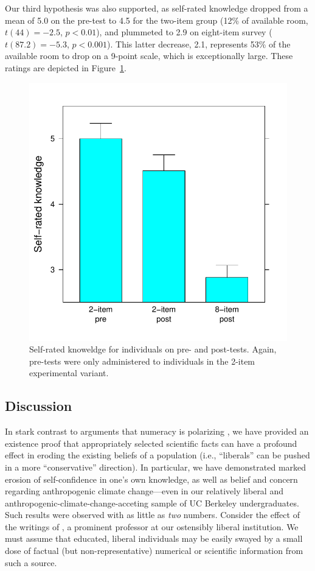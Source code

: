 Our third hypothesis was also supported, as self-rated knowledge dropped from a
mean of 5.0 on the pre-test to 4.5 for the two-item group (12\% of available
room, $t(44)=-2.5$, $p<0.01$), and plummeted to 2.9 on eight-item survey
($t(87.2)=-5.3$, $p<0.001$). This latter decrease, 2.1, represents 53\% of the
available room to drop on a 9-point scale, which is exceptionally large. These
ratings are depicted in Figure~\ref{fig:evil-know}.

\begin{figure}
    \centering
    \includegraphics{evil-know.pdf}
    \caption{Self-rated knoweldge for individuals on pre- and post-tests. Again,
        pre-tests were only administered to individuals in the 2-item
        experimental variant.}
    \label{fig:evil-know}
\end{figure}

\subsection{Discussion}

In stark contrast to arguments that numeracy is polarizing \parencite{kahan}, we
have provided an existence proof that appropriately selected scientific facts
can have a profound effect in eroding the existing beliefs of a population
(i.e., “liberals” can be pushed in a more “conservative” direction). In
particular, we have demonstrated marked erosion of self-confidence in one's own
knowledge, as well as belief and concern regarding anthropogenic climate
change---even in our relatively liberal and
anthropogenic-climate-change-acceting sample of UC Berkeley undergraduates.
Such results were observed with as little as \emph{two} numbers.
Consider the effect of the writings of \textcite{mueller}, a prominent professor
at our ostensibly liberal institution. We must assume that educated, liberal
individuals may be easily swayed by a small dose of factual (but
non-representative) numerical or scientific information from such a source.

